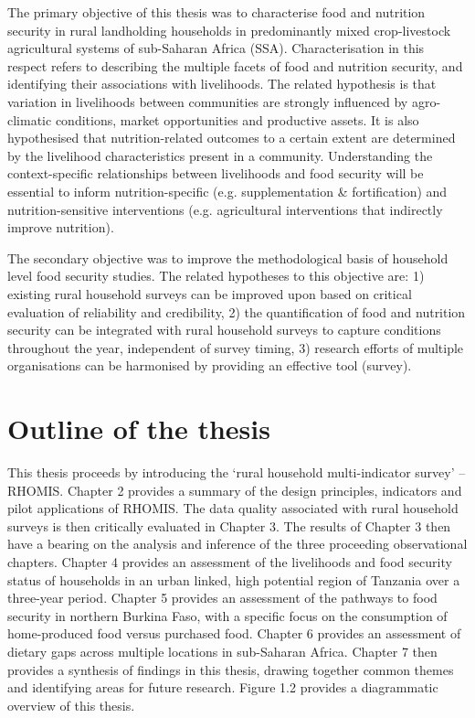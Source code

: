 The primary objective of this thesis was to characterise food and nutrition security in rural landholding households in predominantly mixed crop-livestock agricultural systems of sub-Saharan Africa (SSA). Characterisation in this respect refers to describing the multiple facets of food and nutrition security, and identifying their associations with livelihoods. The related hypothesis is that variation in livelihoods between communities are strongly influenced by agro-climatic conditions, market opportunities and productive assets. It is also hypothesised that nutrition-related outcomes to a certain extent are determined by the livelihood characteristics present in a community. Understanding the context-specific relationships between livelihoods and food security will be essential to inform nutrition-specific (e.g. supplementation \& fortification) and nutrition-sensitive interventions (e.g. agricultural interventions that indirectly improve nutrition).

The secondary objective was to improve the methodological basis of household level food security studies. The related hypotheses to this objective are: 1) existing rural household surveys can be improved upon based on critical evaluation of reliability and credibility, 2) the quantification of food and nutrition security can be integrated with rural household surveys to capture conditions throughout the year, independent of survey timing, 3) research efforts of multiple organisations can be harmonised by providing an effective tool (survey).


\section{Outline of the thesis}

This thesis proceeds by introducing the `rural household multi-indicator survey' -- RHOMIS. Chapter 2 provides a summary of the design principles, indicators and pilot applications of RHOMIS. The data quality associated with rural household surveys is then critically evaluated in Chapter 3. The results of Chapter 3 then have a bearing on the analysis and inference of the three proceeding observational chapters. Chapter 4 provides an assessment of the livelihoods and food security status of households in an urban linked, high potential region of Tanzania over a three-year period. Chapter 5 provides an assessment of the pathways to food security in northern Burkina Faso, with a specific focus on the consumption of home-produced food versus purchased food. Chapter 6 provides an assessment of dietary gaps across multiple locations in sub-Saharan Africa. Chapter 7 then provides a synthesis of findings in this thesis, drawing together common themes and identifying areas for future research. Figure 1.2 provides a diagrammatic overview of this thesis.

